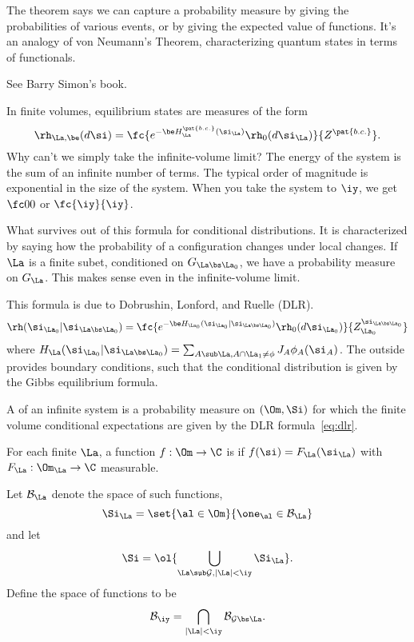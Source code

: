 The theorem says we can capture a probability measure by giving the probabilities of various events, or by giving the expected value of functions.
It's an analogy of von Neumann's Theorem, characterizing quantum states in terms of functionals.

See Barry Simon's book. 

In finite volumes, equilibrium states are measures of the form 
\[\rh_{\La,\be}(d\si) = \fc{e^{-\be H_{\La}^{\pat{b.c.}}(\si_\La)} \rh_0(d\si_{\La})}{Z^{\pat{b.c.}}}.\]
Why can't we simply take the infinite-volume limit? 
The energy of the system is the sum of an infinite number of terms. The typical order of magnitude is exponential in the size of the system. When you take the system to $\iy$, we get $\fc 00$ or $\fc{\iy}{\iy}$.

What survives out of this formula for conditional distributions. It is characterized by saying how the probability of a configuration changes under local changes. If $\La$ is a finite subet, conditioned on $G_{\La\bs \La_0}$, we have a probability measure on $G_{\La}$. This makes sense even in the infinite-volume limit. 

This formula is due to Dobrushin, Lonford, and Ruelle (DLR).
\begin{equation}\label{eq:dlr}
\rh(\si_{\La_0}|\si_{\La\bs \La_0}) = \fc{e^{-\be H_{\La_0}(\si_{\La_0}|\si_{\La\bs \La_0})}\rh_0(d\si_{\La_0})}{Z_{\La_0}^{\si_{\La\bs \La_0}}}
\end{equation}
where $H_{\La}(\si_{\La_0}|\si_{\La\bs \La_0}) = \sum_{A\sub \La, A\cap \La_1\ne \phi} J_A\phi_A(\si_A)$. %
The outside provides boundary conditions, such that the conditional distribution is given by the Gibbs equilibrium formula.

\begin{df}
A  of an infinite system is a probability measure on $(\Om,\Si)$ for which the finite volume conditional expectations are given by the DLR formula~\eqref{eq:dlr}. 
\end{df}

\begin{df}
For each finite $\La$, a function $f:\Om\to \C$ is  if $f(\si) = F_{\La}(\si_\La)$ with $F_\La:\Om_\La\to \C$ measurable.

Let $\cal B_{\La}$ denote the space of such functions, 
\[
\Si_{\La} = \set{\al\in \Om}{\one_\al\in \cal B_{\La}}
\]
and let
\[
\Si = \ol{\bigcup_{\La\sub \cal G,|\La|<\iy} \Si_{\La}}.
\]
Define the space of functions  to be 
\[
\cal B_{\iy} = \bigcap_{|\La|<\iy} \cal B_{\cal G\bs \La}.
\]
\end{df}

